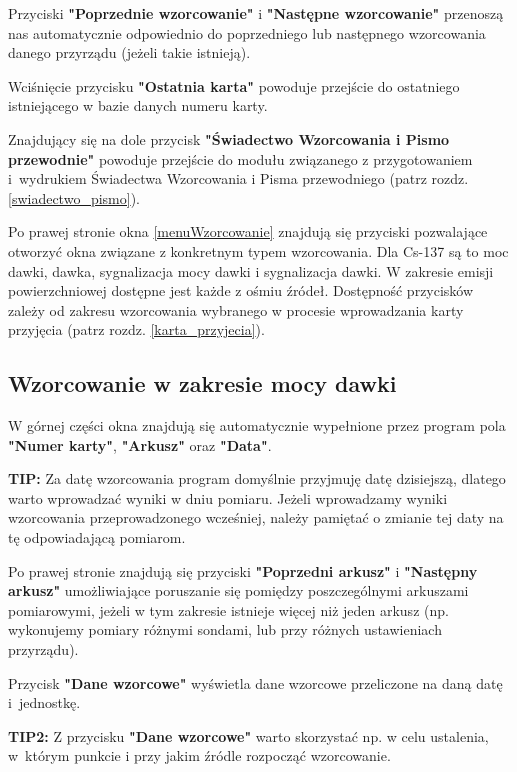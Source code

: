 Przyciski \textbf{"Poprzednie wzorcowanie"} i \textbf{"Następne wzorcowanie"} przenoszą nas automatycznie odpowiednio do poprzedniego lub następnego wzorcowania danego przyrządu (jeżeli takie istnieją).

Wciśnięcie przycisku \textbf{"Ostatnia karta"} powoduje przejście do ostatniego istniejącego w bazie danych numeru karty.

Znajdujący się na dole przycisk \textbf{"Świadectwo Wzorcowania i Pismo przewodnie"} powoduje przejście do modułu związanego z przygotowaniem i~wydrukiem Świadectwa Wzorcowania i Pisma przewodniego (patrz rozdz. \ref{swiadectwo_pismo}).

Po prawej stronie okna \ref{menuWzorcowanie} znajdują się przyciski pozwalające otworzyć okna związane z konkretnym typem wzorcowania. Dla Cs-137 są to moc dawki, dawka, sygnalizacja mocy dawki i sygnalizacja dawki. W zakresie emisji powierzchniowej dostępne jest każde z ośmiu źródeł. Dostępność przycisków zależy od zakresu wzorcowania wybranego w procesie wprowadzania karty przyjęcia (patrz rozdz. \ref{karta_przyjecia}).

\subsection{Wzorcowanie w zakresie mocy dawki}
\label{wzorcowanie_moc_dawki}

W górnej części okna znajdują się automatycznie wypełnione przez program pola \textbf{"Numer karty"}, \textbf{"Arkusz"} oraz \textbf{"Data"}. 

\textbf{TIP:} Za datę wzorcowania program domyślnie przyjmuję datę dzisiejszą, dlatego warto wprowadzać wyniki w dniu pomiaru. Jeżeli wprowadzamy wyniki wzorcowania przeprowadzonego wcześniej, należy pamiętać o zmianie tej daty na tę odpowiadającą pomiarom.

Po prawej stronie znajdują się przyciski \textbf{"Poprzedni arkusz"} i \textbf{"Następny arkusz"} umożliwiające poruszanie się pomiędzy poszczególnymi arkuszami pomiarowymi, jeżeli w tym zakresie istnieje więcej niż jeden arkusz (np. wykonujemy pomiary różnymi sondami, lub przy różnych ustawieniach przyrządu).

Przycisk \textbf{"Dane wzorcowe"} wyświetla dane wzorcowe przeliczone na daną datę i~jednostkę.

\textbf{TIP2:} Z przycisku \textbf{"Dane wzorcowe"} warto skorzystać np. w celu ustalenia, w~którym punkcie i przy jakim źródle rozpocząć wzorcowanie.

